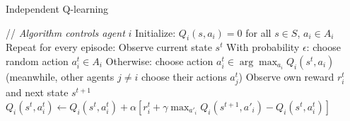 \begin{frame}{Independent Q-learning}

\State // \textit{Algorithm controls agent} \( i \)
\State Initialize: \( Q_i(s, a_i) = 0 \) for all \( s \in S \), \( a_i \in A_i \)
\State Repeat for every episode:
    \State Observe current state \( s^t \)
    \State With probability \( \epsilon \): choose random action \( a_i^t \in A_i \)
    \State Otherwise: choose action \( a_i^t \in \arg\max_{a_i} Q_i(s^t, a_i) \)
    \State (meanwhile, other agents \( j \neq i \) choose their actions \( a_j^t \))
    \State Observe own reward \( r_i^t \) and next state \( s^{t+1} \)
    \State \( Q_i(s^t, a_i^t) \leftarrow Q_i(s^t, a_i^t) + \alpha [ r_i^t + \gamma \max_{a'_i} Q_i(s^{t+1}, a'_i) - Q_i(s^t, a_i^t) ] \)
\EndFor
\ealg
\end{frame}

